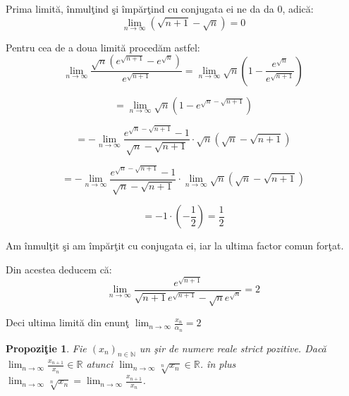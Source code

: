\documentclass[a4paper,12pt,oneside]{report}
\newtheorem{proposition}{Propozi\c tie}
\begin{document}
\begin{enumerate}
Prima limit\u a, \^ inmul\c tind \c si \^ imp\u ar\c tind cu conjugata ei ne da da 0, adic\u a:
\begin{displaymath}
  \lim_{n \to \infty }\left ( \sqrt{n+1}-\sqrt{n} \right ) = 0
\end{displaymath}


Pentru cea de a doua limit\u a proced\u am astfel:
\begin{displaymath}
  \lim_{n \to \infty }\frac{\sqrt{n}\left ( e^{\sqrt{n+1}} -e^{\sqrt{n}} \right )}{e^{\sqrt{n+1}}}  = \lim_{n \to \infty } \sqrt{n}\left ( 1- \frac{e^{\sqrt{n}}}{e^{\sqrt{n+1}}} \right )
\end{displaymath}

\begin{displaymath}
  =\lim_{n \to \infty }\sqrt{n}\left ( 1-e^{\sqrt{n}-\sqrt{n+1}} \right )
\end{displaymath}

\begin{displaymath}
  = - \lim_{n \to \infty } \frac{e^{\sqrt{n}- \sqrt{n+1}}-1}{\sqrt{n}- \sqrt{n+1}} \cdot \sqrt{n}\left ( \sqrt{n}-\sqrt{n+1} \right )
\end{displaymath}

\begin{displaymath}
  = -\lim_{n \to \infty } \frac{e^{\sqrt{n}- \sqrt{n+1}}-1}{\sqrt{n}- \sqrt{n+1}} \cdot \lim_{n \to \infty }\sqrt{n}\left ( \sqrt{n} -\sqrt{n+1}\right )
\end{displaymath}

\begin{displaymath}
  = -1 \cdot \left ( -\frac{1}{2} \right ) =\frac{1}{2}
\end{displaymath}

Am \^ inmul\c tit \c si am \^ imp\u ar\c tit cu conjugata ei, iar la ultima factor comun for\c tat. 

Din acestea deducem c\u a:
\begin{displaymath}
  \lim_{n \to \infty }\frac{e^{\sqrt{n+1}}}{\sqrt{n+1}e^{\sqrt{n+1}}-\sqrt{n}e^{\sqrt{n}}} = 2
\end{displaymath}


Deci ultima limit\u a din enun\c t \(\lim_{n \to \infty } \frac{x_{n}}{\alpha _{n}} = 2\)
\end{enumerate}

\begin{proposition}
  Fie \(\left ( x_{n} \right )_{n\in \mathbb{N}}\) un \c sir de numere reale strict pozitive. Dac\u a \(\lim_{n \to \infty }\frac{x_{n+1}}{x_{n}}\in \mathbb{R}\) atunci \(\lim_{n \to \infty } \sqrt[n]{x_{n}}\in \mathbb{R}\). \^ in plus \(\lim_{n \to \infty } \sqrt[n]{x_{n}} = \lim_{n \to \infty }\frac{x_{n+1}}{x_{n}}\).
\end{proposition}
 
\end{document}
